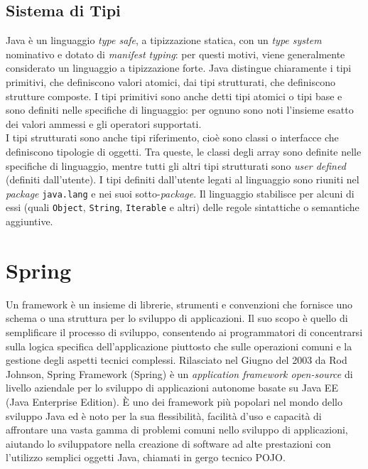 \subsection{Sistema di Tipi}

Java è un linguaggio \textit{type safe}, a tipizzazione statica, con un \textit{type system} nominativo e dotato di \textit{manifest typing}: per questi motivi, viene generalmente considerato un linguaggio a tipizzazione forte. Java distingue chiaramente i tipi primitivi, che definiscono valori atomici, dai tipi strutturati, che definiscono strutture composte. I tipi primitivi sono anche detti tipi atomici o tipi base e sono definiti nelle specifiche di linguaggio: per ognuno sono noti l’insieme esatto dei valori ammessi e gli operatori supportati.\\
I tipi strutturati sono anche tipi riferimento, cioè sono classi o interfacce che definiscono tipologie di oggetti. Tra queste, le classi degli array sono definite nelle specifiche di linguaggio, mentre tutti gli altri tipi strutturati sono \textit{user defined} (definiti dall’utente). I tipi definiti dall’utente legati al linguaggio sono riuniti nel 
\textit{package} \texttt{java.lang} e nei suoi sotto-\textit{package}. Il linguaggio stabilisce per alcuni di essi (quali \texttt{Object}, \texttt{String}, \texttt{Iterable} e altri) delle regole sintattiche o semantiche aggiuntive.\cite{JAVA_typesystem}


\section{Spring}

Un framework è un insieme di librerie, strumenti e convenzioni che fornisce uno schema o una struttura per lo sviluppo di applicazioni. Il suo scopo è quello di semplificare il processo di sviluppo, consentendo ai programmatori di concentrarsi sulla logica specifica dell’applicazione piuttosto che sulle operazioni comuni e la gestione degli aspetti tecnici complessi.\cite{SPRING_amazon}\newline
Rilasciato nel Giugno del 2003 da Rod Johnson, Spring Framework (Spring) è un \textit{application framework open-source} di livello aziendale per lo sviluppo di applicazioni autonome basate su Java EE (Java Enterprise Edition)\cite{SPRING_techtarget}. È uno dei framework più popolari nel mondo dello sviluppo Java ed è noto per la sua flessibilità, facilità d’uso e capacità di affrontare una vasta gamma di problemi comuni nello sviluppo di applicazioni, aiutando lo sviluppatore nella creazione di software ad alte prestazioni con l’utilizzo semplici oggetti Java, chiamati in gergo tecnico POJO.\cite{SPRING_spring}

